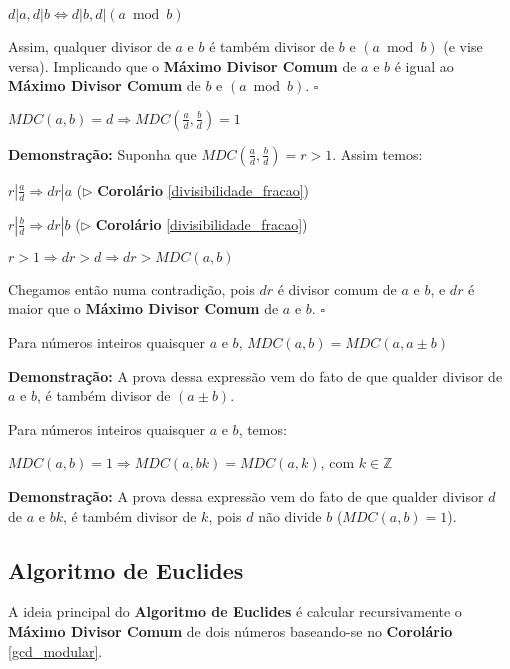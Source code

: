 $d|a, d|b \Leftrightarrow d|b, d|(a \bmod b)$

Assim, qualquer divisor de $a$ e $b$ é também divisor de $b$ e $(a \bmod b)$ (e vise versa). Implicando que o \textbf{Máximo Divisor Comum} de $a$ e $b$
é igual ao \textbf{Máximo Divisor Comum} de $b$ e $(a \bmod b)$. $\square$



\begin{corollary}\label{divisibilidade_mdc}
$MDC(a,b) = d \Rightarrow MDC(\frac{a}{d}, \frac{b}{d}) = 1$
\end{corollary}
\textbf{Demonstração:}
Suponha que $MDC(\frac{a}{d}, \frac{b}{d}) = r > 1$. Assim temos:

$r|\frac{a}{d} \Rightarrow dr|a$ ($\triangleright$ \textbf{Corolário} \autoref{divisibilidade_fracao})

$r|\frac{b}{d} \Rightarrow dr|b$ ($\triangleright$ \textbf{Corolário} \autoref{divisibilidade_fracao})

$r > 1 \Rightarrow dr > d \Rightarrow dr > MDC(a,b)$

Chegamos então numa contradição, pois $dr$ é divisor comum de $a$ e $b$, e $dr$ é maior que o \textbf{Máximo Divisor Comum} de $a$ e $b$. $\square$



\begin{corollary}\label{corolario_gcd_soma}
Para números inteiros quaisquer $a$ e $b$, $MDC(a,b) = MDC(a,a \pm b)$
\end{corollary}
\textbf{Demonstração:}
A prova dessa expressão vem do fato de que qualder divisor de $a$ e $b$, é também divisor de $(a \pm b)$.



\begin{corollary}\label{corolario_gcd_produto}
Para números inteiros quaisquer $a$ e $b$, temos:

$MDC(a,b) = 1 \Rightarrow MDC(a,bk) = MDC(a,k)$, com $k \in \mathbb{Z}$
\end{corollary}
\textbf{Demonstração:}
A prova dessa expressão vem do fato de que qualder divisor $d$ de $a$ e $bk$, é também divisor de $k$, pois $d$ não divide $b$ ($MDC(a,b) = 1$).




\subsection{Algoritmo de Euclides}
A ideia principal do \textbf{Algoritmo de Euclides} é calcular recursivamente o \textbf{Máximo Divisor Comum} de dois números baseando-se no 
\textbf{Corolário} \autoref{gcd_modular}.\\

